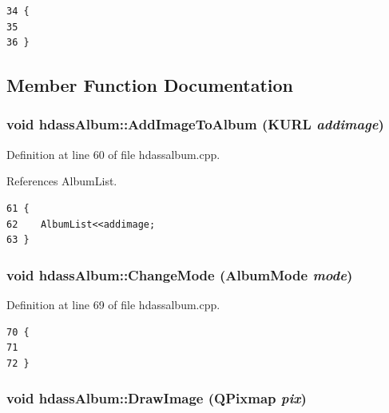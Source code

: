 \footnotesize\begin{verbatim}34 {
35 
36 }
\end{verbatim}\normalsize 


\subsection{Member Function Documentation}
\subsubsection{\setlength{\rightskip}{0pt plus 5cm}void hdass\-Album::Add\-Image\-To\-Album (KURL {\em addimage})\hspace{0.3cm}{\tt  [slot]}}\label{classhdassAlbum_ImageDetiali1}




Definition at line 60 of file hdassalbum.cpp.

References Album\-List.



\footnotesize\begin{verbatim}61 {
62    AlbumList<<addimage;
63 }
\end{verbatim}\normalsize 
{}
\subsubsection{\setlength{\rightskip}{0pt plus 5cm}void hdass\-Album::Change\-Mode ({\bf Album\-Mode} {\em mode})\hspace{0.3cm}{\tt  [slot]}}\label{classhdassAlbum_ImageDetiali3}




Definition at line 69 of file hdassalbum.cpp.



\footnotesize\begin{verbatim}70 {
71 
72 }
\end{verbatim}\normalsize 
{}
\subsubsection{\setlength{\rightskip}{0pt plus 5cm}void hdass\-Album::Draw\-Image (QPixmap {\em pix})}\label{classhdassAlbum_ImageDetiala4}




